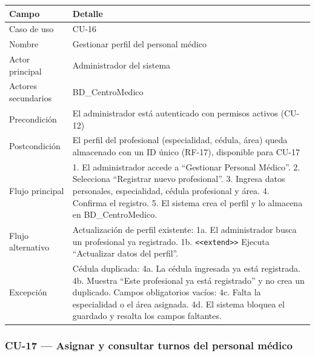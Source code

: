 \documentclass[11pt,a4paper]{article}
\begin{document}
	\begin{longtable}{p{} p{} }
		
		
		\toprule
		\textbf{Campo} &
		\textbf{Detalle}  \\
		\midrule
		\endhead
		
		Caso de uso & CU-16 \\
		Nombre & Gestionar perfil del personal médico \\
		Actor principal & Administrador del sistema \\
		Actores secundarios & BD\_CentroMedico \\
		Precondición & El administrador está autenticado con permisos activos (CU-12) \\
		Postcondición & El perfil del profesional (especialidad, cédula, área) queda almacenado con un ID único (RF-17), disponible para CU-17 \\
		Flujo principal & 1. El administrador accede a ``Gestionar Personal Médico''. 2. Selecciona ``Registrar nuevo profesional''. 3. Ingresa datos personales, especialidad, cédula profesional y área. 4. Confirma el registro. 5. El sistema crea el perfil y lo almacena en BD\_CentroMedico. \\
		Flujo alternativo & Actualización de perfil existente: 1a. El administrador busca un profesional ya registrado. 1b. \texttt{<<extend>>} Ejecuta ``Actualizar datos del perfil''. \\
		Excepción & Cédula duplicada: 4a. La cédula ingresada ya está registrada. 4b. Muestra ``Este profesional ya está registrado'' y no crea un duplicado. Campos obligatorios vacíos: 4c. Falta la especialidad o el área asignada. 4d. El sistema bloquea el guardado y resalta los campos faltantes. \\
		\bottomrule
	\end{longtable}
	
	\subsubsection{CU-17 --- Asignar y consultar turnos del personal médico}
	
\end{document}
